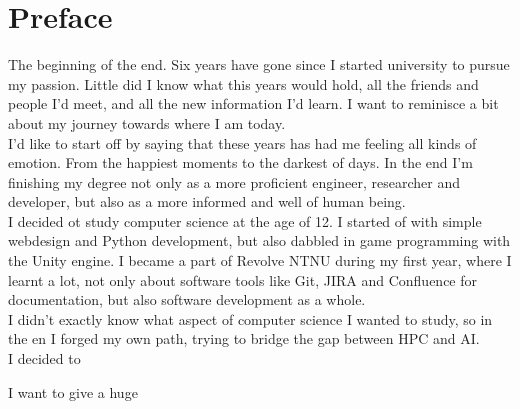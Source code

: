 \chapter*{Preface}

The beginning of the end. Six years have gone since I started university to pursue my passion. Little did I know what this years would hold, all the friends and people I'd meet, and all the new information I'd learn. I want to reminisce a bit about my journey towards where I am today. \\

I'd like to start off by saying that these years has had me feeling all kinds of emotion. From the happiest moments to the darkest of days. In the end I'm finishing my degree not only as a more proficient engineer, researcher and developer, but also as a more informed and well of human being. \\

I decided ot study computer science at the age of 12. I started of with simple webdesign and Python development, but also dabbled in game programming with the Unity engine. I became a part of Revolve NTNU during my first year, where I learnt a lot, not only about software tools like Git, JIRA and Confluence for documentation, but also software development as a whole. \\

I didn't exactly know what aspect of computer science I wanted to study, so in the en I forged my own path, trying to bridge the gap between HPC and AI. \\

I decided to 

I want to give a huge
